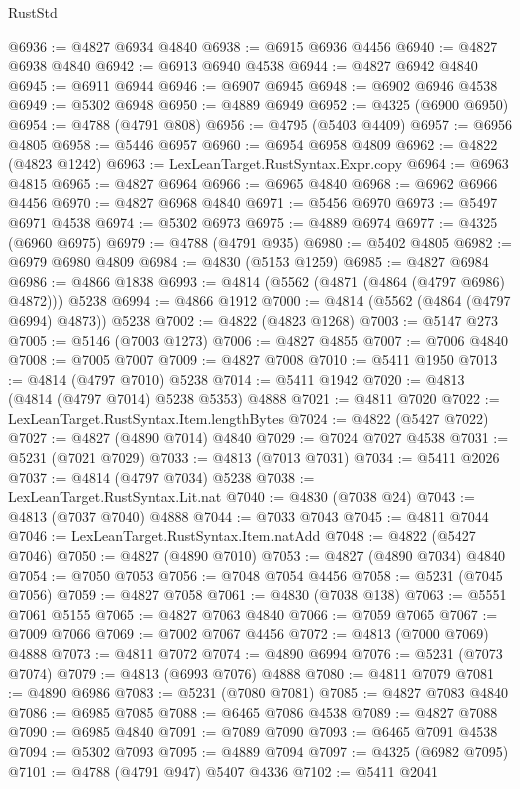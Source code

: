 \begin{lexlean}{RustStd}
\begin{coremodule}
@6936 := @4827 @6934 @4840
@6938 := @6915 @6936 @4456
@6940 := @4827 @6938 @4840
@6942 := @6913 @6940 @4538
@6944 := @4827 @6942 @4840
@6945 := @6911 @6944
@6946 := @6907 @6945
@6948 := @6902 @6946 @4538
@6949 := @5302 @6948
@6950 := @4889 @6949
@6952 := @4325 (@6900 @6950)
@6954 := @4788 (@4791 @808)
@6956 := @4795 (@5403 @4409)
@6957 := @6956 @4805
@6958 := @5446 @6957
@6960 := @6954 @6958 @4809
@6962 := @4822 (@4823 @1242)
@6963 := LexLeanTarget.RustSyntax.Expr.copy
@6964 := @6963 @4815
@6965 := @4827 @6964
@6966 := @6965 @4840
@6968 := @6962 @6966 @4456
@6970 := @4827 @6968 @4840
@6971 := @5456 @6970
@6973 := @5497 @6971 @4538
@6974 := @5302 @6973
@6975 := @4889 @6974
@6977 := @4325 (@6960 @6975)
@6979 := @4788 (@4791 @935)
@6980 := @5402 @4805
@6982 := @6979 @6980 @4809
@6984 := @4830 (@5153 @1259)
@6985 := @4827 @6984
@6986 := @4866 @1838
@6993 := @4814 (@5562 (@4871 (@4864 (@4797 @6986) @4872))) @5238
@6994 := @4866 @1912
@7000 := @4814 (@5562 (@4864 (@4797 @6994) @4873)) @5238
@7002 := @4822 (@4823 @1268)
@7003 := @5147 @273
@7005 := @5146 (@7003 @1273)
@7006 := @4827 @4855
@7007 := @7006 @4840
@7008 := @7005 @7007
@7009 := @4827 @7008
@7010 := @5411 @1950
@7013 := @4814 (@4797 @7010) @5238
@7014 := @5411 @1942
@7020 := @4813 (@4814 (@4797 @7014) @5238 @5353) @4888
@7021 := @4811 @7020
@7022 := LexLeanTarget.RustSyntax.Item.lengthBytes
@7024 := @4822 (@5427 @7022)
@7027 := @4827 (@4890 @7014) @4840
@7029 := @7024 @7027 @4538
@7031 := @5231 (@7021 @7029)
@7033 := @4813 (@7013 @7031)
@7034 := @5411 @2026
@7037 := @4814 (@4797 @7034) @5238
@7038 := LexLeanTarget.RustSyntax.Lit.nat
@7040 := @4830 (@7038 @24)
@7043 := @4813 (@7037 @7040) @4888
@7044 := @7033 @7043
@7045 := @4811 @7044
@7046 := LexLeanTarget.RustSyntax.Item.natAdd
@7048 := @4822 (@5427 @7046)
@7050 := @4827 (@4890 @7010)
@7053 := @4827 (@4890 @7034) @4840
@7054 := @7050 @7053
@7056 := @7048 @7054 @4456
@7058 := @5231 (@7045 @7056)
@7059 := @4827 @7058
@7061 := @4830 (@7038 @138)
@7063 := @5551 @7061 @5155
@7065 := @4827 @7063 @4840
@7066 := @7059 @7065
@7067 := @7009 @7066
@7069 := @7002 @7067 @4456
@7072 := @4813 (@7000 @7069) @4888
@7073 := @4811 @7072
@7074 := @4890 @6994
@7076 := @5231 (@7073 @7074)
@7079 := @4813 (@6993 @7076) @4888
@7080 := @4811 @7079
@7081 := @4890 @6986
@7083 := @5231 (@7080 @7081)
@7085 := @4827 @7083 @4840
@7086 := @6985 @7085
@7088 := @6465 @7086 @4538
@7089 := @4827 @7088
@7090 := @6985 @4840
@7091 := @7089 @7090
@7093 := @6465 @7091 @4538
@7094 := @5302 @7093
@7095 := @4889 @7094
@7097 := @4325 (@6982 @7095)
@7101 := @4788 (@4791 @947) @5407 @4336
@7102 := @5411 @2041

\end{coremodule}
\end{lexlean}
